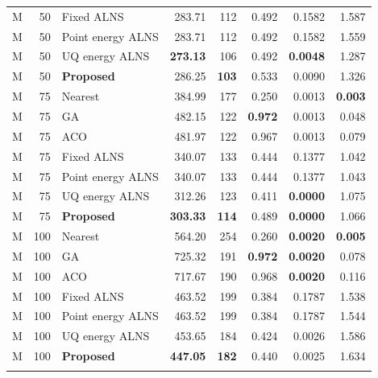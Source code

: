 \begin{longtable}{@{}rrlrrrrr@{}}
M & 50 & Fixed ALNS & 283.71 & 112 & 0.492 & 0.1582 & 1.587 \\

M & 50 & Point energy ALNS & 283.71 & 112 & 0.492 & 0.1582 & 1.559 \\

M & 50 & UQ energy ALNS & \textbf{273.13} & 106 & 0.492 & \textbf{0.0048} & 1.287 \\
\rowcolor{gray!10}
M & 50 & \textbf{Proposed} & 286.25 & \textbf{103} & 0.533 & 0.0090 & 1.326 \\
\addlinespace[2pt]

M & 75 & Nearest & 384.99 & 177 & 0.250 & 0.0013 & \textbf{0.003} \\

M & 75 & GA & 482.15 & 122 & \textbf{0.972} & 0.0013 & 0.048 \\

M & 75 & ACO & 481.97 & 122 & 0.967 & 0.0013 & 0.079 \\

M & 75 & Fixed ALNS & 340.07 & 133 & 0.444 & 0.1377 & 1.042 \\

M & 75 & Point energy ALNS & 340.07 & 133 & 0.444 & 0.1377 & 1.043 \\

M & 75 & UQ energy ALNS & 312.26 & 123 & 0.411 & \textbf{0.0000} & 1.075 \\
\rowcolor{gray!10}
M & 75 & \textbf{Proposed} & \textbf{303.33} & \textbf{114} & 0.489 & \textbf{0.0000} & 1.066 \\
\addlinespace[2pt]

M & 100 & Nearest & 564.20 & 254 & 0.260 & \textbf{0.0020} & \textbf{0.005} \\

M & 100 & GA & 725.32 & 191 & \textbf{0.972} & \textbf{0.0020} & 0.078 \\

M & 100 & ACO & 717.67 & 190 & 0.968 & \textbf{0.0020} & 0.116 \\

M & 100 & Fixed ALNS & 463.52 & 199 & 0.384 & 0.1787 & 1.538 \\

M & 100 & Point energy ALNS & 463.52 & 199 & 0.384 & 0.1787 & 1.544 \\

M & 100 & UQ energy ALNS & 453.65 & 184 & 0.424 & 0.0026 & 1.586 \\
\rowcolor{gray!10}
M & 100 & \textbf{Proposed} & \textbf{447.05} & \textbf{182} & 0.440 & 0.0025 & 1.634 \\
\addlinespace[2pt]


\end{longtable}
